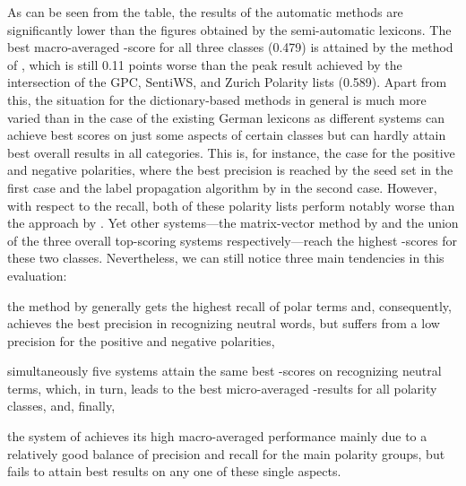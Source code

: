 As can be seen from the table, the results of the automatic methods
are significantly lower than the figures obtained by the
semi-automatic lexicons.  The best macro-averaged \F{}-score for all
three classes (0.479) is attained by the method of
\citet{Blair-Goldensohn:08}, which is still 0.11 points worse than the
peak result achieved by the intersection of the GPC, SentiWS, and
Zurich Polarity lists (0.589).  Apart from this, the situation for the
dictionary-based methods in general is much more varied than in the
case of the existing German lexicons as different systems can achieve
best scores on just some aspects of certain classes but can hardly
attain best overall results in all categories.  This is, for instance,
the case for the positive and negative polarities, where the best
precision is reached by the seed set in the first case and the label
propagation algorithm by \citet{Rao:09} in the second case.  However,
with respect to the recall, both of these polarity lists perform
notably worse than the approach by \citet{Esuli:06c}.  Yet other
systems---the matrix-vector method by \citet{Blair-Goldensohn:08} and
the union of the three overall top-scoring systems
respectively---reach the highest \F{}-scores for these two classes.
Nevertheless, we can still notice three main tendencies in this
evaluation:
\begin{inparaenum}
\item the method by \citet{Esuli:06c} generally gets the highest
  recall of polar terms and, consequently, achieves the best precision
  in recognizing neutral words, but suffers from a low precision for
  the positive and negative polarities,
\item simultaneously five systems attain the same best \F{}-scores on
  recognizing neutral terms, which, in turn, leads to the best
  micro-averaged \F{}-results for all polarity classes, and, finally,
\item the system of \citet{Blair-Goldensohn:08} achieves its high
  macro-averaged performance mainly due to a relatively good balance
  of precision and recall for the main polarity groups, but fails to
  attain best results on any one of these single aspects.
\end{inparaenum}




